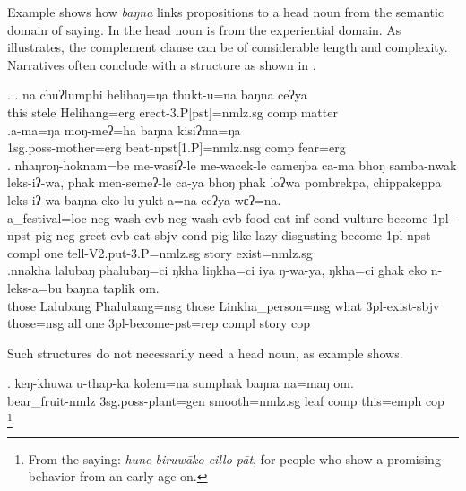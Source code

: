 Example \Next[a] shows how   \emph{baŋna} links  propositions to a head noun from the semantic domain of saying.  In \Next[b] the head noun is from the experiential domain. As \Next[c] illustrates, the complement clause can be of considerable length and complexity. Narratives often conclude with a structure as shown in \Next[d]. 

\ex. \ag.  na   chuʔlumphi helihaŋ=ŋa  thukt-u=na  baŋna ceʔya\\
this stele Helihang{\sc =erg} erect{\sc -3.P[pst]=nmlz.sg} {\sc comp} matter\\
\bg.a-ma=ŋa                moŋ-meʔ=ha                baŋna kisiʔma=ŋa\\
{\sc 1sg.poss-}mother{\sc =erg} beat{\sc -npst[1.P]=nmlz.nsg} {\sc comp} fear{\sc =erg}\\
 
\bg. nhaŋroŋ-hoknam=be    me-wasiʔ-le      me-wacek-le        cameŋba  ca-ma     bhoŋ samba-nwak leks-iʔ-wa,          phak men-semeʔ-le    ca-ya  bhoŋ phak loʔwa pombrekpa,  chippakeppa    leks-iʔ-wa baŋna eko lu-yukt-a=na        ceʔya wɛʔ=na.\\
a\_festival{\sc =loc} {\sc neg}-wash{\sc -cvb} {\sc neg}-wash{\sc -cvb} food eat{\sc -inf} {\sc cond} vulture become{\sc -1pl-npst} pig {\sc neg}-greet{\sc -cvb} eat{\sc -sbjv} {\sc cond} pig like lazy disgusting become{\sc -1pl-npst} {\sc compl} one tell{\sc -V2.put-3.P=nmlz.sg} story exist{\sc [3sg]=nmlz.sg}\\
 
\bg.nnakha lalubaŋ phalubaŋ=ci    ŋkha liŋkha=ci      iya            ŋ-wa-ya,        ŋkha=ci ghak eko n-leks-a=bu baŋna taplik om.\\
those Lalubang Phalubang{\sc =nsg} those Linkha\_person{\sc =nsg} what {\sc 3pl-}exist{\sc -sbjv} those{\sc =nsg} all one {\sc 3pl-}become{\sc -pst=rep} {\sc compl} story {\sc cop}\\
 

Such structures do not necessarily need a head noun, as example \Next shows.

\exg. keŋ-khuwa            u-thap-ka              kolem=na         sumphak baŋna        na=maŋ     om.\\
bear\_fruit{\sc -nmlz} {\sc 3sg.poss-}plant{\sc =gen} smooth{\sc =nmlz.sg} leaf    comp this{\sc =emph} {\sc cop}\\
\footnote{From the  saying: \emph{hune biruwāko cillo pāt}, for people who show a promising behavior from an early age on.}



